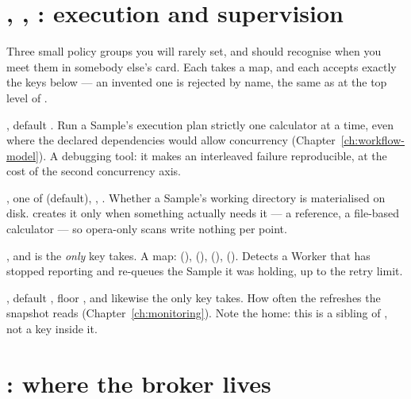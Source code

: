 \section{, , : execution and supervision}
\label{sec:worker-factory}

Three small policy groups you will rarely set, and should recognise when you meet them in
somebody else's card. Each takes a map, and each accepts exactly the keys below --- an
invented one is rejected by name, the same as at the top level of .

\begin{keylist}
  \item[worker.force\_serial\_layers] \opt, default . Run a Sample's
        execution plan strictly one calculator at a time, even where the declared
        dependencies would allow concurrency (Chapter~\ref{ch:workflow-model}). A
        debugging tool: it makes an interleaved failure reproducible, at the cost of the
        second concurrency axis.
  \item[worker.sample\_artifacts] \opt, one of  (default), ,
        . Whether a Sample's working directory is materialised on disk.
         creates it only when something actually needs it --- a
         reference, a file-based calculator --- so opera-only scans write
        nothing per point.
  \item[factory.watchdog] \opt, and  is the \emph{only} key
         takes. A map:  (),
         (),  (),
         (). Detects a Worker that has stopped
        reporting and re-queues the Sample it was holding, up to the retry limit.
  \item[monitor.hz] \opt, default , floor , and likewise the only key
         takes. How often the  refreshes the snapshot
         reads (Chapter~\ref{ch:monitoring}). Note the home: this is
        a sibling of , not a key inside it.
\end{keylist}

\section{: where the broker lives}
\label{sec:redis-settings}

